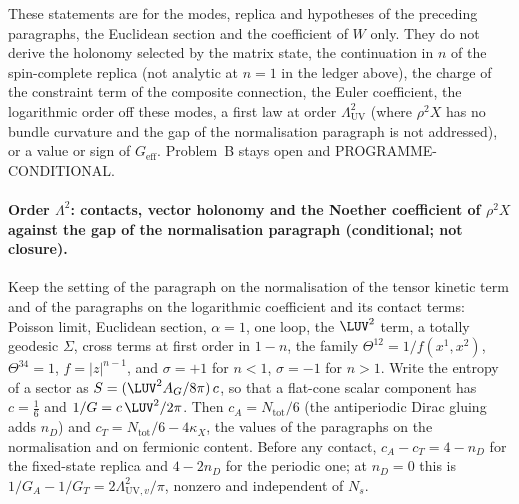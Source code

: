 These statements are for the modes, replica and hypotheses of the preceding paragraphs, the Euclidean section and the coefficient of \(W\) only. They do not derive the holonomy selected by the matrix state, the continuation in \(n\) of the spin-complete replica (not analytic at \(n=1\) in the ledger above), the charge of the constraint term of the composite connection, the Euler coefficient, the logarithmic order off these modes, a first law at order \(\Lambda_{\mathrm{UV}}^2\) (where \(\rho^2X\) has no bundle curvature and the gap of the normalisation paragraph is not addressed), or a value or sign of \(G_{\mathrm{eff}}\). Problem~B stays open and PROGRAMME-CONDITIONAL.

\paragraph{Order \(\Lambda^2\): contacts, vector holonomy and the Noether coefficient of \(\rho^2X\) against the gap of the normalisation paragraph (conditional; not closure).}
Keep the setting of the paragraph on the normalisation of the tensor kinetic term and of the paragraphs on the logarithmic coefficient and its contact terms: Poisson limit, Euclidean section, \(\alpha=1\), one loop, the \(\LUV^2\) term, a totally geodesic \(\Sigma\), cross terms at first order in \(1-n\), the family \(\Theta^{12}=1/f(x^1,x^2)\), \(\Theta^{34}=1\), \(f=\lvert z\rvert^{n-1}\), and \(\sigma=+1\) for \(n<1\), \(\sigma=-1\) for \(n>1\). Write the entropy of a sector as \(S=(\LUV^2A_G/8\pi)\,c\), so that a flat-cone scalar component has \(c=\tfrac16\) and \(1/G=c\,\LUV^2/2\pi\). Then \(c_A=N_{\mathrm{tot}}/6\) (the antiperiodic Dirac gluing adds \(n_D\)) and \(c_T=N_{\mathrm{tot}}/6-4\kappa_X\), the values of the paragraphs on the normalisation and on fermionic content. Before any contact, \(c_A-c_T=4-n_D\) for the fixed-state replica and \(4-2n_D\) for the periodic one; at \(n_D=0\) this is \(1/G_A-1/G_T=2\Lambda_{\mathrm{UV},v}^2/\pi\), nonzero and independent of \(N_s\).

